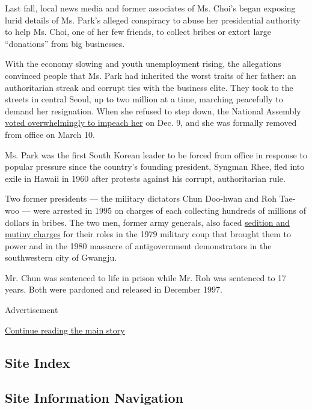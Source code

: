 Last fall, local news media and former associates of Ms. Choi's began
exposing lurid details of Ms. Park's alleged conspiracy to abuse her
presidential authority to help Ms. Choi, one of her few friends, to
collect bribes or extort large ``donations'' from big businesses.

With the economy slowing and youth unemployment rising, the allegations
convinced people that Ms. Park had inherited the worst traits of her
father: an authoritarian streak and corrupt ties with the business
elite. They took to the streets in central Seoul, up to two million at a
time, marching peacefully to demand her resignation. When she refused to
step down, the National Assembly
\href{https://www.nytimes3xbfgragh.onion/2016/12/09/world/asia/south-korea-president-park-geun-hye-impeached.html}{voted
overwhelmingly to impeach her} on Dec. 9, and she was formally removed
from office on March 10.

Ms. Park was the first South Korean leader to be forced from office in
response to popular pressure since the country's founding president,
Syngman Rhee, fled into exile in Hawaii in 1960 after protests against
his corrupt, authoritarian rule.

Two former presidents --- the military dictators Chun Doo-hwan and Roh
Tae-woo --- were arrested in 1995 on charges of each collecting hundreds
of millions of dollars in bribes. The two men, former army generals,
also faced
\href{http://www.nytimes3xbfgragh.onion/1995/12/22/world/south-korea-indicts-2-former-presidents-in-staging-of-1979-coup.html}{sedition
and mutiny charges} for their roles in the 1979 military coup that
brought them to power and in the 1980 massacre of antigovernment
demonstrators in the southwestern city of Gwangju.

Mr. Chun was sentenced to life in prison while Mr. Roh was sentenced to
17 years. Both were pardoned and released in December 1997.

Advertisement

\protect\hyperlink{after-bottom}{Continue reading the main story}

\hypertarget{site-index}{%
\subsection{Site Index}\label{site-index}}

\hypertarget{site-information-navigation}{%
\subsection{Site Information
Navigation}\label{site-information-navigation}}

